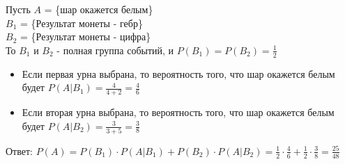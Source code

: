 \begin{exercise}
	Пусть $A$ = \{шар окажется белым\} \\ $B_1$ = \{Результат монеты - гебр\} \\ $B_2$ = \{Результат монеты - цифра\} \\ То $B_1$ и $B_2$ - полная группа событий, и $P(B_1) = P(B_2) = \frac{1}{2}$
	\begin{itemize}
		\item Если первая урна выбрана, то вероятность того, что шар окажется белым будет $P(A | B_1) = \frac{4}{4+2} = \frac{4}{6}$
		\item Если вторая урна выбрана, то вероятность того, что шар окажется белым будет $P(A | B_2) = \frac{3}{3 + 5} = \frac{3}{8}$
	\end{itemize}
	Ответ: $P(A) = P(B_1) \cdot P(A | B_1) + P(B_2) \cdot P(A | B_2) = \frac{1}{2} \cdot \frac{4}{6} + \frac{1}{2} \cdot \frac{3}{8} = \frac{25}{48}$
\end{exercise}